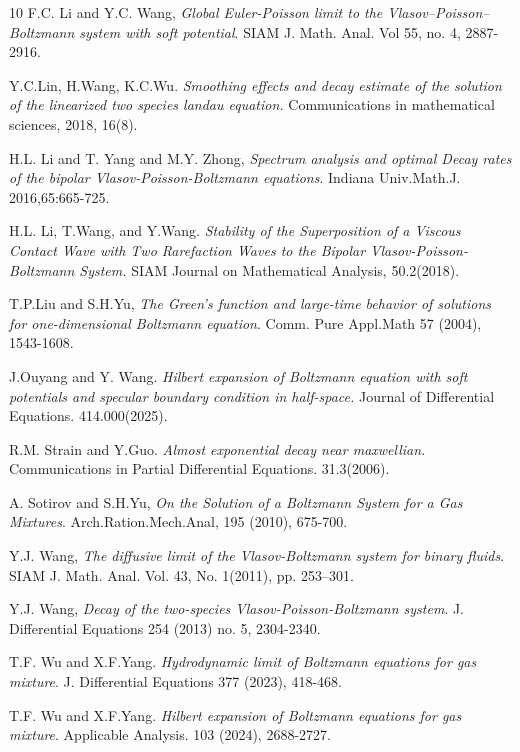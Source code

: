 \documentclass[reqno]{amsart}
\numberwithin{equation}{section}
\numberwithin{equation}{section}
\begin{document}
\begin{thebibliography}{10}
		 F.C. Li and Y.C. Wang,  \emph{Global Euler-Poisson limit to the Vlasov--Poisson--Boltzmann system with soft
			potential}. SIAM J. Math. Anal. Vol 55, no. 4, 2887-2916.
		
		 Y.C.Lin, H.Wang, 
		K.C.Wu. \emph{Smoothing effects and decay estimate of the solution of the linearized two species landau equation.} Communications in mathematical sciences, 2018, 16(8).
		
		 H.L. Li and T. Yang and M.Y. Zhong,  \emph{Spectrum analysis and optimal Decay rates of the bipolar Vlasov-Poisson-Boltzmann equations}. Indiana Univ.Math.J. 2016,65:665-725.
		
		 H.L. Li, T.Wang, and Y.Wang. \emph{Stability of the Superposition of a Viscous Contact Wave with Two Rarefaction Waves to the Bipolar Vlasov-Poisson-Boltzmann System.} SIAM Journal on Mathematical Analysis, 50.2(2018). %
		
		 T.P.Liu and S.H.Yu, \emph{The Green's function and large-time behavior of solutions for one-dimensional Boltzmann equation}. Comm. Pure Appl.Math 57 (2004),  1543-1608. %
		
		 J.Ouyang and  Y. Wang. \emph{Hilbert expansion of Boltzmann equation with soft potentials and specular boundary condition in half-space.} Journal of Differential Equations. 414.000(2025).
		
		 R.M. Strain and  Y.Guo.  \emph{Almost exponential decay near maxwellian.} Communications in Partial Differential Equations. 31.3(2006). %
		
		\bibitem{[YU2010]} A. Sotirov and S.H.Yu, \emph{On the Solution of a Boltzmann System for a Gas Mixtures}. Arch.Ration.Mech.Anal, 195 (2010), 675-700. %
	
		
		 Y.J. Wang, \emph{The diffusive limit of the Vlasov-Boltzmann system
			for binary fluids}. SIAM J. Math. Anal. Vol. 43, No. 1(2011), pp. 253–301.
		
		 Y.J. Wang, \emph{ Decay of the two-species Vlasov-Poisson-Boltzmann system}. J. Differential Equations 254 (2013) no. 5, 2304-2340.
		
		 T.F. Wu and X.F.Yang. \emph{Hydrodynamic limit of Boltzmann equations for gas
			mixture}. J. Differential Equations 377 (2023), 418-468.
			
		 T.F. Wu and X.F.Yang.  \emph{Hilbert expansion of Boltzmann equations for gas
		mixture}. Applicable Analysis. 103  (2024), 2688-2727.
		

\end{thebibliography}
\end{document}
